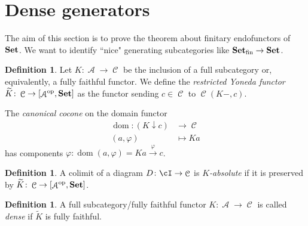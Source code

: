 \documentclass[a4paper,11pt,oneside,openany]{scrbook}
\newcommand{\catname}[1]{{\normalfont\textbf{#1}}}
\newcommand{\Set}{\catname{Set}}
\DeclareMathOperator{\op}{\text{op}}
\DeclareMathOperator{\A}{\mathcal{A}}
\DeclareMathOperator{\C}{\mathcal{C}}
\DeclareMathOperator{\dom}{dom}
\theoremstyle{definition}
\theoremstyle{definition}
\newtheorem{defn}[thm]{Definition} %
\begin{document}
\section{Dense generators}
The aim of this section is to prove the theorem about finitary endofunctors of $\Set$. We want to identify ``nice" generating subcategories like $\Set_\text{fin}\to\Set$.
\begin{defn}
	Let $K\colon\A\to\C$ be the inclusion of a full subcategory or, equivalently, a fully faithful functor. We define the \emph{restricted Yoneda functor} $\widetilde{K}\colon\C\to\left[\A^{\op},\Set\right]$ as the functor sending $c\in\C$ to $\C(K-,c)$.
\end{defn}
The \emph{canonical cocone} on the domain functor
\begin{align*}
\dom\colon(K\downarrow c)&\to\C\\
(a,\varphi)&\mapsto Ka
\end{align*}
has components $\varphi\colon\dom(a,\varphi)=Ka\xrightarrow{\varphi}c$.
\begin{defn}
	A colimit of a diagram $D\colon\cI\to\C$ is \emph{$K$-absolute} if it is preserved by $\widetilde{K}\colon\C\to\left[\A^{\op},\Set\right]$.
\end{defn}
	\begin{defn}
		A full subcategory/fully faithful functor $K\colon\A\to\C$ is called \emph{dense} if $\widetilde{K}$ is fully faithful.
	\end{defn}
\end{document}
